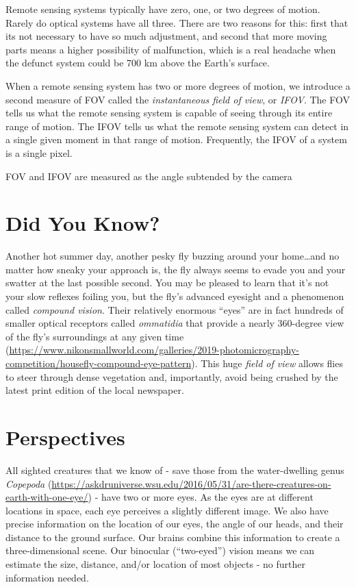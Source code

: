 \documentclass[
]{book}
\begin{document}
Remote sensing systems typically have zero, one, or two degrees of motion. Rarely do optical systems have all three. There are two reasons for this: first that its not necessary to have so much adjustment, and second that more moving parts means a higher possibility of malfunction, which is a real headache when the defunct system could be 700 km above the Earth's surface.

When a remote sensing system has two or more degrees of motion, we introduce a second measure of FOV called the \emph{instantaneous field of view}, or \emph{IFOV}. The FOV tells us what the remote sensing system is capable of seeing through its entire range of motion. The IFOV tells us what the remote sensing system can detect in a single given moment in that range of motion. Frequently, the IFOV of a system is a single pixel.

FOV and IFOV are measured as the angle subtended by the camera

\hypertarget{did-you-know}{%
\section*{Did You Know?}\label{did-you-know}}

Another hot summer day, another pesky fly buzzing around your home\ldots and no matter how sneaky your approach is, the fly always seems to evade you and your swatter at the last possible second. You may be pleased to learn that it's not your slow reflexes foiling you, but the fly's advanced eyesight and a phenomenon called \emph{compound vision}. Their relatively enormous ``eyes'' are in fact hundreds of smaller optical receptors called \emph{ommatidia} that provide a nearly 360-degree view of the fly's surroundings at any given time (\url{https://www.nikonsmallworld.com/galleries/2019-photomicrography-competition/housefly-compound-eye-pattern}). This huge \emph{field of view} allows flies to steer through dense vegetation and, importantly, avoid being crushed by the latest print edition of the local newspaper.

\hypertarget{perspectives}{%
\section{Perspectives}\label{perspectives}}

All sighted creatures that we know of - save those from the water-dwelling genus \emph{Copepoda} (\url{https://askdruniverse.wsu.edu/2016/05/31/are-there-creatures-on-earth-with-one-eye/}) - have two or more eyes. As the eyes are at different locations in space, each eye perceives a slightly different image. We also have precise information on the location of our eyes, the angle of our heads, and their distance to the ground surface. Our brains combine this information to create a three-dimensional scene. Our binocular (``two-eyed'') vision means we can estimate the size, distance, and/or location of most objects - no further information needed.
\end{document}
